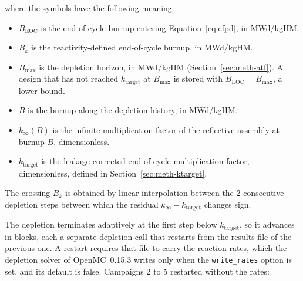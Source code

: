 \noindent where the symbols have the following meaning.

\begin{itemize}
  \item $B_\mathrm{EOC}$ is the end-of-cycle burnup entering
        Equation~\eqref{eq:efpd}, in MWd/kgHM.

  \item $B_k$ is the reactivity-defined end-of-cycle burnup, in
        MWd/kgHM.

  \item $B_\mathrm{max}$ is the depletion horizon, in MWd/kgHM
        (Section~\ref{sec:meth-atf}). A design that has not reached
        $k_\mathrm{target}$ at $B_\mathrm{max}$ is stored with
        $B_\mathrm{EOC} = B_\mathrm{max}$, a lower bound.

  \item $B$ is the burnup along the depletion history, in MWd/kgHM.

  \item $k_\infty(B)$ is the infinite multiplication factor of the
        reflective assembly at burnup $B$, dimensionless.

  \item $k_\mathrm{target}$ is the leakage-corrected end-of-cycle multiplication factor, dimensionless, defined in
        Section~\ref{sec:meth-ktarget}.
\end{itemize}

The crossing $B_k$ is obtained by linear interpolation between the 2
consecutive depletion steps between which the residual
$k_\infty - k_\mathrm{target}$ changes sign.

The depletion terminates adaptively at the first step below
$k_\mathrm{target}$, so it advances in blocks, each a separate
depletion call that restarts from the results file of the previous one.
\label{sec:restart_defect}%
A restart requires that file to carry the reaction rates, which the
depletion solver of OpenMC~0.15.3 writes only when the
\texttt{write\_rates} option is set, and its default is false.
Campaigns 2 to 5 restarted without the rates:

